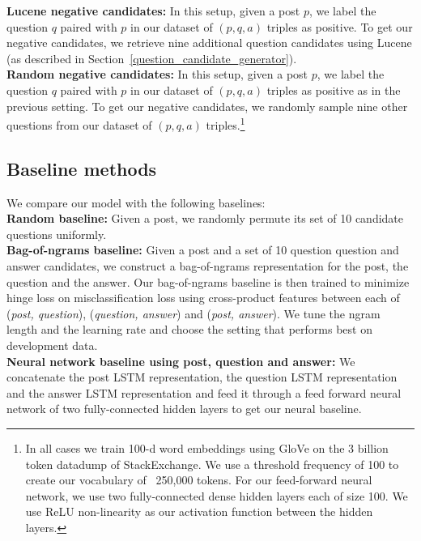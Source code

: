 \documentclass[11pt]{report}
\begin{document}
\textbf{Lucene negative candidates:} In this setup, given a post $p$, we label the question $q$ paired with $p$ in our dataset of $(p, q, a)$ triples as positive. To get our negative candidates, we retrieve nine additional question candidates using Lucene (as described in Section~\ref{question_candidate_generator}).\\
\textbf{Random negative candidates:} In this setup, given a post $p$, we label the question $q$ paired with $p$ in our dataset of $(p, q, a)$ triples as positive as in the previous setting. To get our negative candidates, we randomly sample nine other questions from our dataset of $(p, q, a)$ triples.\footnote{In all cases we train 100-d word embeddings using GloVe \cite{pennington2014glove} on the 3 billion token datadump of StackExchange. We use a threshold frequency of 100 to create our vocabulary of ~250,000 tokens. For our feed-forward neural network, we use two fully-connected dense hidden layers each of size 100. We use ReLU \cite{nair2010rectified} non-linearity as our activation function between the hidden layers.}


\subsection{Baseline methods}\label{baselines}

We compare our model with the following baselines:\\
\textbf{Random baseline:} Given a post, we randomly permute its set of 10 candidate questions uniformly.\\
\textbf{Bag-of-ngrams baseline:} Given a post and a set of 10 question question and answer candidates, we construct a bag-of-ngrams representation for the post, the question and the answer. Our bag-of-ngrams baseline is then trained to minimize hinge loss on misclassification loss using cross-product features between each of (\textit{post, question}), (\textit{question, answer}) and (\textit{post, answer}). We tune the ngram length and the learning rate and choose the setting that performs best on development data.\\
\textbf{Neural network baseline using post, question and answer:} We concatenate the post LSTM representation, the question LSTM representation and the answer LSTM representation and feed it through a feed forward neural network of two fully-connected hidden layers to get our neural baseline. 
\end{document}
